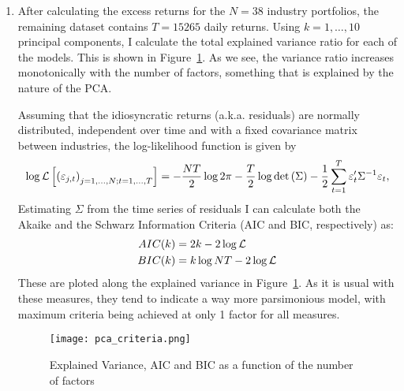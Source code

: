 \begin{solution}
    \begin{enumerate}[label = \Alph*)]
        \item After calculating the excess returns for the \(N = 38\) industry portfolios, the remaining dataset contains \(T = 15265\) daily returns. Using \(k = 1, \dots, 10\) principal components, I calculate the total explained variance ratio for each of the models. This is shown in Figure~\ref{fig:pca_criteria}. As we see, the variance ratio increases monotonically with the number of factors, something that is explained by the nature of the PCA.
        
        Assuming that the idiosyncratic returns (a.k.a. residuals) are normally distributed, independent over time and with a fixed covariance matrix between industries, the log-likelihood function is given by
        \[
            \log\mathcal{L}\left[ \left( \varepsilon_{j,t} \right)_{j = 1,\dots,N; t = 1, \dots, T} \right] = -\frac{NT}{2}\log{2\pi} - \frac{T}{2}\log{\det{\left( \Sigma \right)}} - \frac{1}{2}\sum_{t = 1}^{T}\varepsilon_t^\prime\Sigma^{-1}\varepsilon_t,
        \]
        Estimating \(\Sigma\) from the time series of residuals I can calculate both the Akaike and the Schwarz Information Criteria (AIC and BIC, respectively) as:
        \begin{align*}
            AIC(k) & = 2k - 2 \log\mathcal{L} \\
            BIC(k) & = k\log{NT} - 2 \log\mathcal{L}
        \end{align*}
        These are ploted along the explained variance in Figure~\ref{fig:pca_criteria}. As it is usual with these measures, they tend to indicate a way more parsimonious model, with maximum criteria being achieved at only 1 factor for all measures.
        \begin{figure}[!htbp]
            \begin{small}
                \begin{center}
                    \texttt{[image: pca\_criteria.png]}
                \end{center}
                \caption{Explained Variance, AIC and BIC as a function of the number of factors}
                \label{fig:pca_criteria}
            \end{small}
        \end{figure}


\end{enumerate}
\end{solution}
